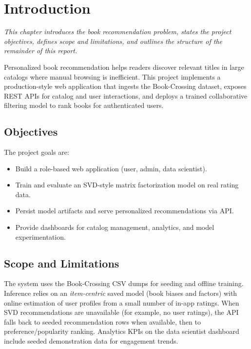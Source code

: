 \documentclass[12pt,a4paper]{report}
\newcommand{\chapterdesc}[1]{%
    \vspace{-0.6\baselineskip}
    \noindent\hspace*{1.5cm}\parbox{\dimexpr\textwidth-1.5cm\relax}{\textit{#1}}
    \par\vspace{0.3\baselineskip}
}
\begin{document}
\tableofcontents
\listoffigures
\listoftables
\clearpage


\chapter{Introduction}
\chapterdesc{This chapter introduces the book recommendation problem, states the project objectives, defines scope and limitations, and outlines the structure of the remainder of this report.}

Personalized book recommendation helps readers discover relevant titles in large catalogs where manual browsing is inefficient. This project implements a production-style web application that ingests the Book-Crossing dataset, exposes REST APIs for catalog and user interactions, and deploys a trained collaborative filtering model to rank books for authenticated users.

\section{Objectives}
The project goals are:
\begin{itemize}
    \item Build a role-based web application (user, admin, data scientist).
    \item Train and evaluate an SVD-style matrix factorization model on real rating data.
    \item Persist model artifacts and serve personalized recommendations via API.
    \item Provide dashboards for catalog management, analytics, and model experimentation.
\end{itemize}

\section{Scope and Limitations}
The system uses the Book-Crossing CSV dumps for seeding and offline training. Inference relies on an \emph{item-centric} saved model (book biases and factors) with online estimation of user profiles from a small number of in-app ratings. When SVD recommendations are unavailable (for example, no user ratings), the API falls back to seeded recommendation rows when available, then to preference/popularity ranking. Analytics KPIs on the data scientist dashboard include seeded demonstration data for engagement trends.
\end{document}
